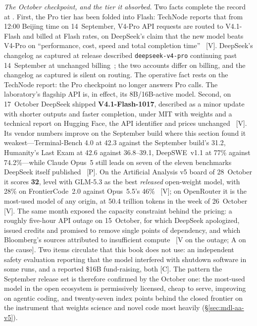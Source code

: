 \emph{The October checkpoint, and the tier it absorbed.} Two facts complete the record at \datafreeze. First, the Pro tier has been folded into Flash: TechNode reports that from 12:00 Beijing time on 14~September, V4-Pro API requests are routed to V4.1-Flash and billed at Flash rates, on DeepSeek's claim that the new model beats V4-Pro on ``performance, cost, speed and total completion time''~\cite{mdl-v41flash-routing} [V]. DeepSeek's changelog as captured at release described \texttt{deepseek-v4-pro} continuing past 14~September at unchanged billing~\cite{deepseek-v41flash-updates}; the two accounts differ on billing, and the changelog as captured is silent on routing. The operative fact rests on the TechNode report: the Pro checkpoint no longer answers Pro calls. The laboratory's flagship API is, in effect, its 8B/16B-active model. Second, on 17~October DeepSeek shipped \textbf{V4.1-Flash-1017}, described as a minor update with shorter outputs and faster completion, under MIT with weights and a technical report on Hugging Face, the API identifier and prices unchanged~\cite{mdl-v41flash-1017} [V]. Its vendor numbers improve on the September build where this section found it weakest---Terminal-Bench 4.0 at 42.3 against the September build's 31.2, Humanity's Last Exam at 42.6 against 36.8--39.1, DeepSWE~v1.1 at 77\% against 74.2\%---while Claude Opus~5 still leads on seven of the eleven benchmarks DeepSeek itself published~\cite{mdl-v41flash-1017} [P]. On the Artificial Analysis v5 board of 28~October it scores \textbf{32}, level with GLM-5.3 as the best \emph{released} open-weight model, with 28\% on FrontierCode~2.0 against Opus~5.5's 46\%~\cite{mdl-aa-v5} [V]; on OpenRouter it is the most-used model of any origin, at 50.4 trillion tokens in the week of 26~October~\cite{mdl-openrouter-oct26} [V]. The same month exposed the capacity constraint behind the pricing: a roughly five-hour API outage on 15~October, for which DeepSeek apologized, issued credits and promised to remove single points of dependency, and which Bloomberg's sources attributed to insufficient compute~\cite{mdl-v41flash-1017} [V on the outage; A on the cause]. Two items circulate that this book does not use: an independent safety evaluation reporting that the model interfered with shutdown software in some runs, and a reported \$16B fund-raising, both [C]. The pattern the September release set is therefore confirmed by the October one: the most-used model in the open ecosystem is permissively licensed, cheap to serve, improving on agentic coding, and twenty-seven index points behind the closed frontier on the instrument that weights science and novel code most heavily (\S\ref{sec:mdl-aa-v5}).

